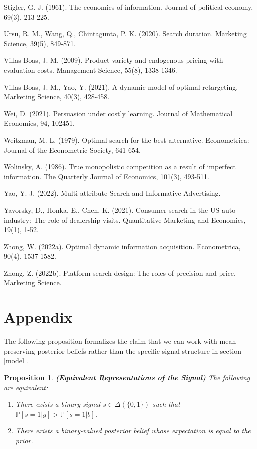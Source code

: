 \documentclass[11pt]{extarticle}
\newtheorem{proposition}{Proposition}
\begin{document}
Stigler, G. J. (1961). The economics of information. Journal of political economy, 69(3), 213-225.

Ursu, R. M., Wang, Q., Chintagunta, P. K. (2020). Search duration. Marketing Science, 39(5), 849-871.

Villas-Boas, J. M. (2009). Product variety and endogenous pricing with evaluation costs. Management Science, 55(8), 1338-1346.

Villas-Boas, J. M., Yao, Y. (2021). A dynamic model of optimal retargeting. Marketing Science, 40(3), 428-458.

Wei, D. (2021). Persuasion under costly learning. Journal of Mathematical Economics, 94, 102451.

Weitzman, M. L. (1979). Optimal search for the best alternative. Econometrica: Journal of the Econometric Society, 641-654.

Wolinsky, A. (1986). True monopolistic competition as a result of imperfect information. The Quarterly Journal of Economics, 101(3), 493-511.

Yao, Y. J. (2022). Multi-attribute Search and Informative Advertising.

Yavorsky, D., Honka, E., Chen, K. (2021). Consumer search in the US auto industry: The role of dealership visits. Quantitative Marketing and Economics, 19(1), 1-52.

Zhong, W. (2022a). Optimal dynamic information acquisition. Econometrica, 90(4), 1537-1582.

Zhong, Z. (2022b). Platform search design: The roles of precision and price. Marketing Science.	

\newpage
\section*{Appendix}
The following proposition formalizes the claim that we can work with mean-preserving posterior beliefs rather than the specific signal structure in section \ref{model}.
\begin{proposition}\label{equiv_rep}\textbf{(Equivalent Representations of the Signal)} The following are equivalent:	
	\begin{enumerate}
		\item There exists a binary signal $s \in \Delta(\{0,1\})$ such that $\mathbb{P}[s=1\vert g] > \mathbb{P}[s=1\vert b]$.
		
		\item There exists a binary-valued posterior belief whose expectation is equal to the prior.
	\end{enumerate}	
\end{proposition}
\end{document}
